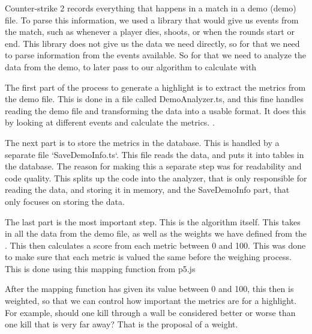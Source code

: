 \documentclass[a4paper,twoside]{bth}
\begin{document}
Counter-strike 2 records everything that happens in a match in a \Gls{demo} (demo) file. To parse this information, we used a library that would give us events from the match, such as whenever a player dies, shoots, or when the rounds start or end. This library does not give us the data we need directly, so for that we need to parse information from the events available. So for that we need to analyze the data from the demo, to later pass to our algorithm to calculate with 

The first part of the process to generate a highlight is to extract the metrics from the demo file. This is done in a file called DemoAnalyzer.ts, and this fine handles reading the demo file and transforming the data into a usable format. It does this by looking at different events  and calculate the metrics. .

The next part is to store the metrics in the database. This is handled by a separate file `SaveDemoInfo.ts`. This file reads the data, and puts it into tables in the database. The reason for making this a separate step was for readability and code quality. This splits up the code into the analyzer, that is only responsible for reading the data, and storing it in memory, and the SaveDemoInfo part, that only focuses on storing the data. 

The last part is the most important step. This is the algorithm itself. This takes in all the data from the demo file, as well as the weights we have defined from the . This then calculates a score from each metric between 0 and 100. This was done to make sure that each metric is valued the same before the weighing process. This is done using this mapping function from p5.js\cite{p5jsMap}

After the mapping function has given its value between 0 and 100, this then is weighted, so that we can control how important the metrics are for a highlight. For example, should one kill through a wall be considered better or worse than one kill that is very far away? That is the proposal of a weight. 
\end{document}
